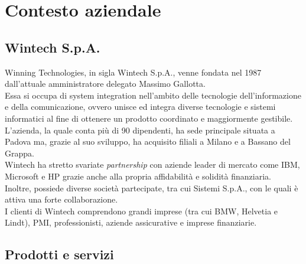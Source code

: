\chapter{Contesto aziendale}
\label{cap:contestoAziendale}

\section{Wintech S.p.A.}
Winning Technologies, in sigla Wintech S.p.A., venne fondata nel 1987 dall'attuale amministratore delegato Massimo Gallotta.\\
Essa si occupa di \gls{system integration} nell'ambito delle tecnologie dell'informazione e della comunicazione, ovvero unisce ed integra diverse tecnologie e sistemi informatici al fine di ottenere un prodotto coordinato e maggiormente gestibile.\\
L'azienda, la quale conta più di 90 dipendenti, ha sede principale situata a Padova ma, grazie al suo sviluppo, ha acquisito filiali a Milano e a Bassano del Grappa.\\
Wintech ha stretto svariate \emph{partnership} con aziende leader di mercato come IBM, Microsoft e HP grazie anche alla propria affidabilità e solidità finanziaria.\\ 
Inoltre, possiede diverse società partecipate, tra cui Sistemi S.p.A., con le quali è attiva una forte collaborazione.\\
I clienti di Wintech comprendono grandi imprese (tra cui BMW, Helvetia e Lindt), PMI, professionisti, aziende assicurative e imprese finanziarie. 

\section{Prodotti e servizi}
